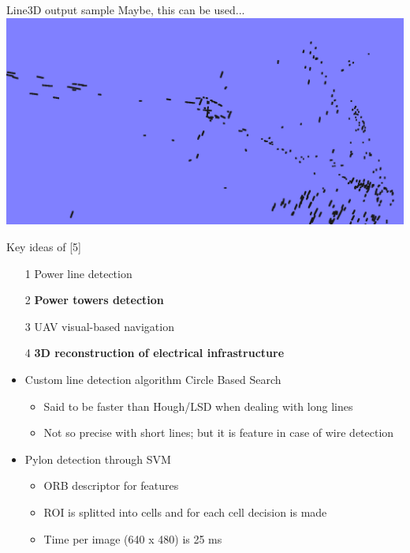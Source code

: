 \documentclass{beamer}
\begin{document}
\begin{frame}[t, fragile]{Line3D output sample}
Maybe, this can be used...
\includegraphics[width=1\linewidth]{line3d_output}
\end{frame}



\begin{frame}[t, fragile]{Key ideas of [5]}
\begin{itemize}
\item [1] Power line detection
\item [2] \textbf{Power towers detection}
\item [3] UAV visual-based navigation
\item [4] \textbf{3D reconstruction of electrical infrastructure}
\end{itemize}

\begin{itemize}
\item Custom line detection algorithm Circle Based Search
\begin{itemize}
\item Said to be faster than Hough/LSD when dealing with long lines
\item Not so precise with short lines; but it is feature in case of wire detection
\end{itemize}
\item Pylon detection through SVM
\begin{itemize}
\item ORB descriptor for features
\item ROI is splitted into cells and for each cell decision is made
\item Time per image (640 x 480) is 25 ms 
\end{itemize}
\end{itemize}
\end{frame}
\end{document}
